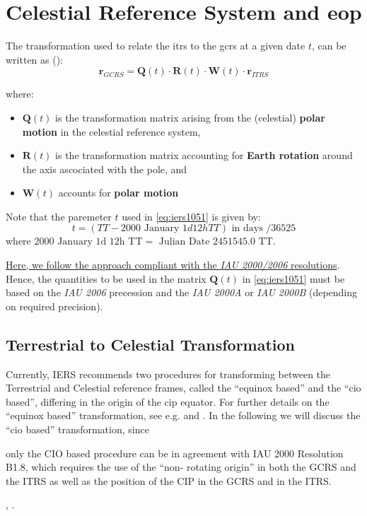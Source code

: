 \chapter{Celestial Reference System and \gls{eop}}
\label{ch:celestial-rf-and-eop}

The transformation used to relate the \gls{itrs} to the \gls{gcrs} at a 
given date $t$, can be written as (\cite{iers2010}):
\begin{equation}
    \bm{r}_{GCRS} = \bm{Q}(t) \cdot \bm{R}(t) \cdot \bm{W}(t) \cdot \bm{r}_{ITRS}
    \label{eq:iers1051}
\end{equation}

where:
\begin{itemize}
    \item $\bm{Q}(t)$ is the transformation matrix arising from the
    (celestial) \textbf{polar motion} in the celestial reference system,
    \item $\bm{R}(t)$ is the transformation matrix accounting for 
    \textbf{Earth rotation} around the axis ascociated with the pole, and
    \item $\bm{W}(t)$ accounts for \textbf{polar motion}
\end{itemize}

Note that the paremeter $t$ used in \ref{eq:iers1051} is given by:
\begin{equation}
    t = \left( TT - 2000 \text{ January } 1d 12h TT \right)
    \text{ in days } / 36525
\end{equation}
where $2000 \text{ January 1d 12h TT} = \text{ Julian Date } 2451545.0 \text{ TT}$.

\ul{Here, we follow the approach compliant with the \emph{IAU 2000/2006} 
resolutions}. Hence, the quantities to be used in the matrix $\bm{Q}(t)$ in 
\ref{eq:iers1051} must be based on the \emph{IAU 2006} precession and the 
\emph{IAU 2000A} or \emph{IAU 2000B} (depending on required precision).

\section{Terrestrial to Celestial Transformation}
\label{sec:ter2cel-trans}

Currently, IERS recommends two procedures for transforming between the 
Terrestrial and Celestial reference frames, called the ``equinox based'' 
and the ``\gls{cio} based'', differing in the origin of the \gls{cip} 
equator. For further details on the ``equinox based'' transformation, see 
e.g. \cite{iers2010} and \cite{esaa13}. In the following we will discuss the 
``\gls{cio} based'' transformation, since
\begin{displayquote}
    only the CIO based
procedure can be in agreement with IAU 2000 Resolution B1.8, which requires the use of the “non-
rotating origin” in both the GCRS and the ITRS as well as the position of the CIP in the GCRS
and in the ITRS.
\end{displayquote}, \cite{iers2010}.

